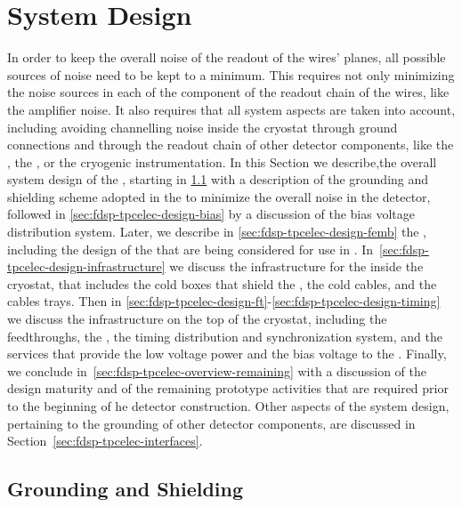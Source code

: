 \section{System Design}
\label{sec:fdsp-tpcelec-design}

In order to keep the overall noise of the readout of the 
wires' planes, all possible sources of noise need to be kept to a
minimum. This requires not only minimizing the noise sources in each
of the component of the readout chain of the  wires, like
the  amplifier noise. It also requires that all system aspects
are taken into account, including avoiding channelling noise inside
the cryostat through ground connections and through the readout
chain of other detector components, like the , the ,
or the cryogenic instrumentation. In this Section we describe,the overall
system design of the , starting in
\ref{sec:fdsp-tpcelec-design-grounding} with a description of the
grounding and shielding scheme adopted in the  
to minimize the overall noise in the detector, followed in
\ref{sec:fdsp-tpcelec-design-bias} by a discussion of the bias
voltage distribution system. Later, we describe in 
\ref{sec:fdsp-tpcelec-design-femb} the , including
the design of the  that are being considered for
use in . In~\ref{sec:fdsp-tpcelec-design-infrastructure}
we discuss the infrastructure for the  inside the cryostat,
that includes the cold boxes that shield the , the
cold cables, and the cables trays. Then in
\ref{sec:fdsp-tpcelec-design-ft}-\ref{sec:fdsp-tpcelec-design-timing} we discuss 
the infrastructure on the top of the cryostat, including the
feedthroughs, the , the timing distribution and
synchronization system, and the services that provide the low
voltage power and the bias voltage to the . Finally,
we conclude in~\ref{sec:fdsp-tpcelec-overview-remaining}
with a discussion of the design maturity and of
the remaining prototype activities that are required prior to
the beginning of he detector construction. Other aspects of
the system design, pertaining to the grounding of other 
detector components, are discussed in Section~\ref{sec:fdsp-tpcelec-interfaces}.

\subsection{Grounding and Shielding}
\label{sec:fdsp-tpcelec-design-grounding}

